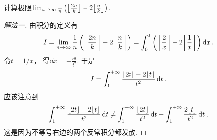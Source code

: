 \begin{example}
计算极限\(\lim_{n\to\infty} \frac1n \left( \floor*{\frac{2n}{k}} - 2 \floor*{\frac{n}{k} \vphantom{\frac{2n}{k}}} \right)\).
\begin{solution}\let\qed\relax
\begin{proof}[解法一]
由积分的定义有\begin{equation*}
	I = \lim_{n\to\infty} \frac1n \left( \floor*{\frac{2n}{k}} - 2 \floor*{\frac{n}{k} \vphantom{\frac{2n}{k}}} \right)
	= \int_0^1 \left( \floor*{\frac2x} - 2 \floor*{\frac1x} \right) \dd{x}.
\end{equation*}
令\(t = 1/x\)，
得\(\dd{x} = -\frac{\dd{t}}{t^2}\).
于是\begin{equation*}
	I = \int_1^{+\infty} \frac{\lfloor2t\rfloor - 2\lfloor t\rfloor}{t^2} \dd{t}.
\end{equation*}
应该注意到\begin{equation*}
	\int_1^{+\infty} \frac{\lfloor2t\rfloor - 2\lfloor t\rfloor}{t^2} \dd{t}
	\neq
	\int_1^{+\infty} \frac{\lfloor2t\rfloor}{t^2} \dd{t}
	- \int_1^{+\infty} \frac{2\lfloor t\rfloor}{t^2} \dd{t},
\end{equation*}
这是因为不等号右边的两个反常积分都发散.


\end{proof}
\end{solution}
\end{example}
